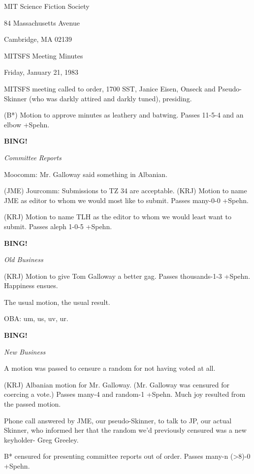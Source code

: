 \documentclass[12pt]{article}
\newcommand{\bing}{{\bf BING!} }
\newcommand{\goto}[1]{\bing \vskip 12pt \centerline{{\em{#1}}}}
\begin{document}
\begin{center}

MIT Science Fiction Society 

84 Massachusetts Avenue

Cambridge, MA 02139

\vspace{12pt}

MITSFS Meeting Minutes 

Friday, January 21, 1983

\end{center}
 
\vspace{18pt}

\setlength{\parskip}{6pt}

\noindent
MITSFS meeting called to order, 1700 SST,
Janice Eisen, Onseck and Pseudo-Skinner (who was darkly attired and darkly tuned), presiding.

(B*) Motion to approve minutes as leathery and batwing. Passes 11-5-4 and an elbow +Spehn.

\goto{Committee Reports}

Moocomm: Mr. Galloway said something in Albanian.

(JME) Jourcomm: Submissions to TZ 34 are acceptable. (KRJ) Motion to name JME as editor to whom we would most like to submit. Passes many-0-0 +Spehn.

(KRJ) Motion to name TLH as the editor to whom we would least want to submit. Passes aleph 1-0-5 +Spehn.

\goto{Old Business}

(KRJ) Motion to give Tom Galloway a better gag. Passes thousands-1-3 +Spehn. Happiness ensues.

The usual motion, the usual result.

OBA: um, us, uv, ur.

\goto{New Business}

A motion was passed to censure a random for not having voted at all.

(KRJ) Albanian motion for Mr. Galloway. (Mr. Galloway was censured for coercing a vote.) Passes many-4 and random-1 +Spehn. Much joy resulted from the passed motion.

Phone call answered by JME, our pseudo-Skinner, to talk to JP, our actual Skinner, who informed her that the random we'd previously censured was a new keyholder- Greg Greeley.

B* censured for presenting committee reports out of order. Passes many-n (>8)-0 +Spehn.
\end{document}
